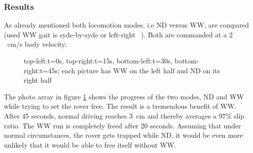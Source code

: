 \documentclass[a4paper,twocolumn]{esapub2005} %
\begin{document}
\subsubsection{Results} As already mentioned both locomotion modes, i.e ND versus WW, are compared (used WW gait is syde-by-syde or left-right ~\cite{LucWalkingGaits}). Both are commanded at a 2 ~\unit{cm/s}
body velocity.

\begin{figure}[h!]
    \centering	
        \caption{top-left:t=0s,  top-right:t=15s, bottom-left:t=30s,
        bottom-right:t=45s; each picture has WW on the left half and
        ND on its right half }
    \label{fig:volleysequence}
\end{figure}

The photo array in figure \ref{fig:volleysequence} shows the progress of the
two modes, ND and WW while trying to set the rover free.
The result is a tremendous benefit of WW. After 45 seconds, normal
driving reaches 3~\unit{cm} and thereby averages a 97\% slip ratio. The WW
run is completely freed after 20 seconds. Assuming that under normal
circumstances, the rover gets trapped while ND, it would be even
more unlikely that it would be able to free itself without WW.
\end{document}
